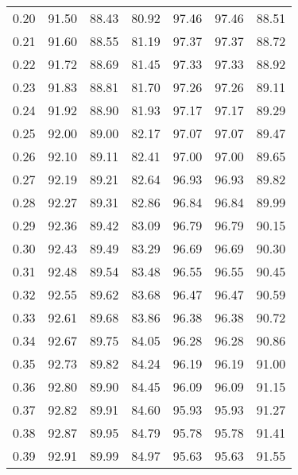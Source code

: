 \begin{tabular}{|c|c|c|c|c|c|c|}
      0.20 &     91.50 &     88.43 &      80.92 &   97.46 &      97.46 &         88.51 \\
      0.21 &     91.60 &     88.55 &      81.19 &   97.37 &      97.37 &         88.72 \\
      0.22 &     91.72 &     88.69 &      81.45 &   97.33 &      97.33 &         88.92 \\
      0.23 &     91.83 &     88.81 &      81.70 &   97.26 &      97.26 &         89.11 \\
      0.24 &     91.92 &     88.90 &      81.93 &   97.17 &      97.17 &         89.29 \\
      0.25 &     92.00 &     89.00 &      82.17 &   97.07 &      97.07 &         89.47 \\
      0.26 &     92.10 &     89.11 &      82.41 &   97.00 &      97.00 &         89.65 \\
      0.27 &     92.19 &     89.21 &      82.64 &   96.93 &      96.93 &         89.82 \\
      0.28 &     92.27 &     89.31 &      82.86 &   96.84 &      96.84 &         89.99 \\
      0.29 &     92.36 &     89.42 &      83.09 &   96.79 &      96.79 &         90.15 \\
      0.30 &     92.43 &     89.49 &      83.29 &   96.69 &      96.69 &         90.30 \\
      0.31 &     92.48 &     89.54 &      83.48 &   96.55 &      96.55 &         90.45 \\
      0.32 &     92.55 &     89.62 &      83.68 &   96.47 &      96.47 &         90.59 \\
      0.33 &     92.61 &     89.68 &      83.86 &   96.38 &      96.38 &         90.72 \\
      0.34 &     92.67 &     89.75 &      84.05 &   96.28 &      96.28 &         90.86 \\
      0.35 &     92.73 &     89.82 &      84.24 &   96.19 &      96.19 &         91.00 \\
      0.36 &     92.80 &     89.90 &      84.45 &   96.09 &      96.09 &         91.15 \\
      0.37 &     92.82 &     89.91 &      84.60 &   95.93 &      95.93 &         91.27 \\
      0.38 &     92.87 &     89.95 &      84.79 &   95.78 &      95.78 &         91.41 \\
      0.39 &     92.91 &     89.99 &      84.97 &   95.63 &      95.63 &         91.55 \\

\end{tabular}
